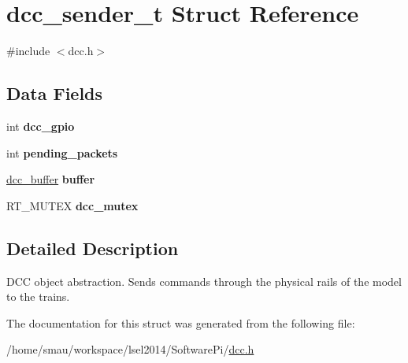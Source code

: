 \hypertarget{structdcc__sender__t}{\section{dcc\-\_\-sender\-\_\-t Struct Reference}
\label{structdcc__sender__t}
}


{\ttfamily \#include $<$dcc.\-h$>$}

\subsection*{Data Fields}
\begin{DoxyCompactItemize}
\item 
\hypertarget{structdcc__sender__t_af2c1eaf325bc7f7ad3b9b7786f67e879}{int {\bfseries dcc\-\_\-gpio}}\label{structdcc__sender__t_af2c1eaf325bc7f7ad3b9b7786f67e879}

\item 
\hypertarget{structdcc__sender__t_a79529dfa62070e8ebd1d937f1185ab40}{int {\bfseries pending\-\_\-packets}}\label{structdcc__sender__t_a79529dfa62070e8ebd1d937f1185ab40}

\item 
\hypertarget{structdcc__sender__t_acc8b35dd0c2450149f54443409074b9d}{\hyperlink{structdcc__buffer}{dcc\-\_\-buffer} {\bfseries buffer}}\label{structdcc__sender__t_acc8b35dd0c2450149f54443409074b9d}

\item 
\hypertarget{structdcc__sender__t_ac1cddbb20c0c48d2a6fa8fa0e4f07083}{R\-T\-\_\-\-M\-U\-T\-E\-X {\bfseries dcc\-\_\-mutex}}\label{structdcc__sender__t_ac1cddbb20c0c48d2a6fa8fa0e4f07083}

\end{DoxyCompactItemize}


\subsection{Detailed Description}
D\-C\-C object abstraction. Sends commands through the physical rails of the model to the trains. 

The documentation for this struct was generated from the following file\-:\begin{DoxyCompactItemize}
\item 
/home/smau/workspace/lsel2014/\-Software\-Pi/\hyperlink{dcc_8h}{dcc.\-h}\end{DoxyCompactItemize}
